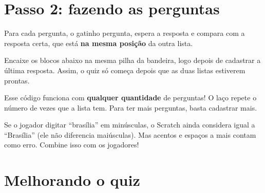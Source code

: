 \section{Passo 2: fazendo as perguntas}

Para cada pergunta, o gatinho pergunta, espera a resposta e compara com a resposta certa, que está \textbf{na mesma posição} da outra lista.

Encaixe os blocos abaixo na mesma pilha da bandeira, logo depois de cadastrar a última resposta. Assim, o quiz só começa depois que as duas listas estiverem prontas.

\begin{codigo}[O jogo]
\renewcommand{\sbw}{410pt}
\begin{pilha}
\sbcend
{}
\sbcend
{}
\end{pilha}
\end{codigo}

\begin{dica}
Esse código funciona com \textbf{qualquer quantidade} de perguntas! O laço repete o número de vezes que a lista tem. Para ter mais perguntas, basta cadastrar mais.
\end{dica}

\begin{cuidado}
Se o jogador digitar ``brasília'' em minúsculas, o Scratch ainda considera igual a ``Brasília'' (ele não diferencia maiúsculas). Mas acentos e espaços a mais contam como erro. Combine isso com os jogadores!
\end{cuidado}

\section{Melhorando o quiz}

